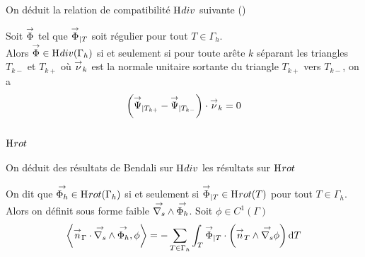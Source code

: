 On déduit la relation de compatibilité \(\mathrm{H}_\mathrm{{}}{div}\) suivante (\cite[Prop.~5.1]{bendali_equations_2014})
\begin{prop}
    Soit \({\overset{\rightarrow}{\Phi}}\) tel que \({\overset{\rightarrow}{\Phi}}_{|T}\) soit régulier pour tout \(T\in\Gamma_h\).\\
    Alors \({\overset{\rightarrow}{\Phi}} \in \mathrm{H}_\mathrm{{}}{div}(\Gamma_h)\) si et seulement si pour toute arête \(k\) séparant les triangles \(T_{k-}\) et \(T_{k+}\) où \({\overset{\rightarrow}{\nu}}_k\) est la normale unitaire sortante du triangle \(T_{k+}\) vers \(T_{k-}\), on a
    \begin{equation}
        \left( {\overset{\rightarrow}{\Psi}}_{|T_{k+}} - {\overset{\rightarrow}{\Psi}}_{|T_{k-}} \right ) \cdot {\overset{\rightarrow}{\nu}}_k = 0
    \end{equation}
\end{prop}
    
\subsection[Hrot]{\(\mathrm{H}_\mathrm{{}}{rot}\)}

On déduit des résultats de Bendali sur \(\mathrm{H}_\mathrm{{}}{div}\) les résultats sur \(\mathrm{H}_\mathrm{{}}{rot}\)

\begin{defn}
    On dit que \({\overset{\rightarrow}{\Phi_h}} \in \mathrm{H}_\mathrm{{}}{rot}(\Gamma_h)\) si et seulement si \({\overset{\rightarrow}{\Phi}}_{|T} \in \mathrm{H}_\mathrm{{}}{rot}(T)\) pour tout \(T \in \Gamma_h\).\\
    Alors on définit sous forme faible \({\overset{\rightarrow}{\nabla_s}} \wedge {\overset{\rightarrow}{\Phi_h}} \).
    Soit \(\phi \in C^1(\Gamma)\) 
    \begin{equation}
        \left< \vn_\Gamma \cdot \vrots \vect{\Phi_h}, \phi \right> %
        = - \sum_{T\in\Gamma_h} \int_T \vect{\Phi}_{|T}  \cdot \left( \vn_T \pvect \vgrads \phi \right) \dd{T}
    \end{equation}
\end{defn}

